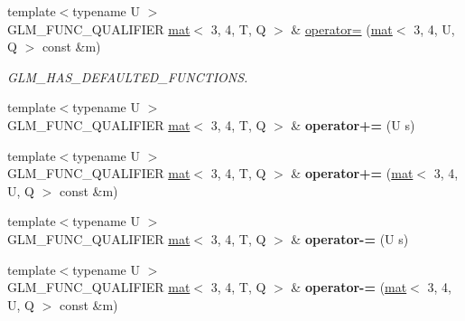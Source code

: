 \begin{DoxyCompactItemize}
{\footnotesize template$<$typename U $>$ }\\G\+L\+M\+\_\+\+F\+U\+N\+C\+\_\+\+Q\+U\+A\+L\+I\+F\+I\+ER \hyperlink{structglm_1_1mat}{mat}$<$ 3, 4, T, Q $>$ \& \hyperlink{structglm_1_1mat_3_013_00_014_00_01T_00_01Q_01_4_a3ca0ae1ed188a28294b9e21ffc31e175}{operator=} (\hyperlink{structglm_1_1mat}{mat}$<$ 3, 4, U, Q $>$ const \&m)
\begin{DoxyCompactList}\small\item\em G\+L\+M\+\_\+\+H\+A\+S\+\_\+\+D\+E\+F\+A\+U\+L\+T\+E\+D\+\_\+\+F\+U\+N\+C\+T\+I\+O\+NS. \end{DoxyCompactList}\item 
\mbox{\label{structglm_1_1mat_3_013_00_014_00_01T_00_01Q_01_4_a8b2499990108087ab7e9bcc364ead6b1}} 
{\footnotesize template$<$typename U $>$ }\\G\+L\+M\+\_\+\+F\+U\+N\+C\+\_\+\+Q\+U\+A\+L\+I\+F\+I\+ER \hyperlink{structglm_1_1mat}{mat}$<$ 3, 4, T, Q $>$ \& {\bfseries operator+=} (U s)
\item 
\mbox{\label{structglm_1_1mat_3_013_00_014_00_01T_00_01Q_01_4_a34254ab9a3f60274b681b3a1c0a3bf67}} 
{\footnotesize template$<$typename U $>$ }\\G\+L\+M\+\_\+\+F\+U\+N\+C\+\_\+\+Q\+U\+A\+L\+I\+F\+I\+ER \hyperlink{structglm_1_1mat}{mat}$<$ 3, 4, T, Q $>$ \& {\bfseries operator+=} (\hyperlink{structglm_1_1mat}{mat}$<$ 3, 4, U, Q $>$ const \&m)
\item 
\mbox{\label{structglm_1_1mat_3_013_00_014_00_01T_00_01Q_01_4_add8deef5c20a96480b2dd587c057ab2a}} 
{\footnotesize template$<$typename U $>$ }\\G\+L\+M\+\_\+\+F\+U\+N\+C\+\_\+\+Q\+U\+A\+L\+I\+F\+I\+ER \hyperlink{structglm_1_1mat}{mat}$<$ 3, 4, T, Q $>$ \& {\bfseries operator-\/=} (U s)
\item 
\mbox{\label{structglm_1_1mat_3_013_00_014_00_01T_00_01Q_01_4_a2226def89213f65ec0c850f016191fed}} 
{\footnotesize template$<$typename U $>$ }\\G\+L\+M\+\_\+\+F\+U\+N\+C\+\_\+\+Q\+U\+A\+L\+I\+F\+I\+ER \hyperlink{structglm_1_1mat}{mat}$<$ 3, 4, T, Q $>$ \& {\bfseries operator-\/=} (\hyperlink{structglm_1_1mat}{mat}$<$ 3, 4, U, Q $>$ const \&m)

\end{DoxyCompactItemize}

